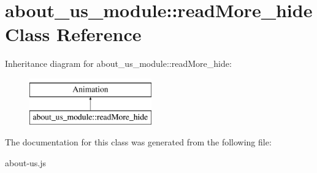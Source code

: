 \hypertarget{classabout__us__module_1_1readMore__hide}{\section{about\-\_\-us\-\_\-module\-:\-:read\-More\-\_\-hide Class Reference}
\label{classabout__us__module_1_1readMore__hide}
}
Inheritance diagram for about\-\_\-us\-\_\-module\-:\-:read\-More\-\_\-hide\-:\begin{figure}[H]
\begin{center}
\leavevmode
\includegraphics[height=2.000000cm]{classabout__us__module_1_1readMore__hide}
\end{center}
\end{figure}


The documentation for this class was generated from the following file\-:\begin{DoxyCompactItemize}
\item 
about-\/us.\-js\end{DoxyCompactItemize}
